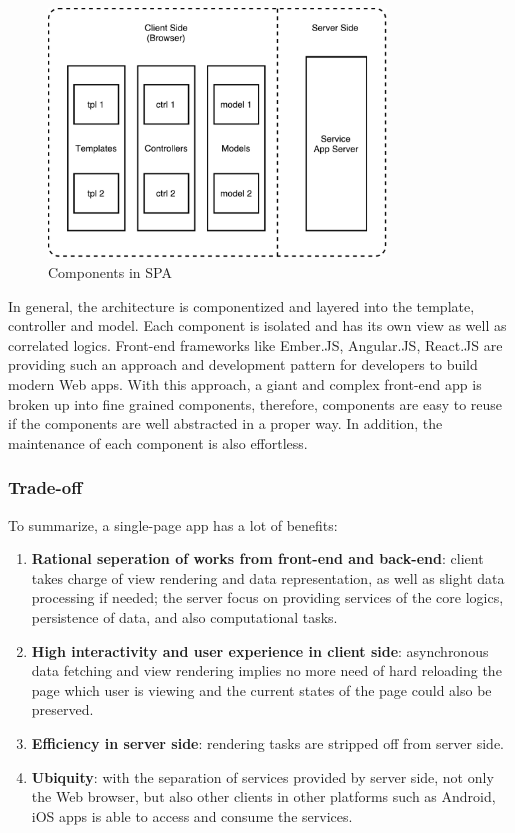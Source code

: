 \begin{figure}[!htbp]
  \centering
    \includegraphics[width=0.8\textwidth]{Figures/tech-Web-arch-cmp.pdf}
  \caption{Components in SPA}
  \label{fig:3.4}
\end{figure}

In general, the architecture is componentized and layered into the template, controller and model. Each component is isolated and has its own view as well as correlated logics. Front-end frameworks like Ember.JS, Angular.JS, React.JS are providing such an approach and development pattern for developers to build modern Web apps. With this approach, a giant and complex front-end app is broken up into fine grained components, therefore, components are easy to reuse if the components are well abstracted in a proper way. In addition, the maintenance of each component is also effortless.


\subsubsection{Trade-off}
To summarize, a single-page app has a lot of benefits:
\begin{enumerate}
\item
\textbf{Rational seperation of works from front-end and back-end}: client takes charge of view rendering and data representation, as well as slight data processing if needed; the server focus on providing services of the core logics, persistence of data, and also computational tasks.
\item
\textbf{High interactivity and user experience in client side}: asynchronous data fetching and view rendering implies no more need of hard reloading the page which user is viewing and the current states of the page could also be preserved.
\item
\textbf{Efficiency in server side}: rendering tasks are stripped off from server side.
\item
\textbf{Ubiquity}: with the separation of services provided by server side, not only the Web browser, but also other clients in other platforms such as Android, iOS apps is able to access and consume the services.
\end{enumerate}

